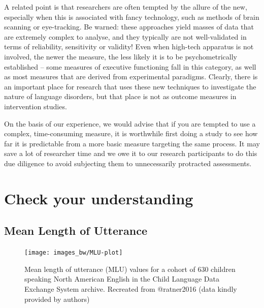 \documentclass{krantz}
\begin{document}
A related point is that researchers are often tempted by the allure of the new, especially when this is associated with fancy technology, such as methods of brain scanning or eye-tracking. Be warned: these approaches yield masses of data that are extremely complex to analyse, and they typically are not well-validated in terms of reliability, sensitivity or validity! Even when high-tech apparatus is not involved, the newer the measure, the less likely it is to be psychometrically established -- some measures of executive functioning fall in this category, as well as most measures that are derived from experimental paradigms. Clearly, there is an important place for research that uses these new techniques to investigate the nature of language disorders, but that place is not as outcome measures in intervention studies.

On the basis of our experience, we would advise that if you are tempted to use a complex, time-consuming measure, it is worthwhile first doing a study to see how far it is predictable from a more basic measure targeting the same process. It may save a lot of researcher time and we owe it to our research participants to do this due diligence to avoid subjecting them to unnecessarily protracted assessments.

\hypertarget{check-your-understanding-2}{%
\section{Check your understanding}\label{check-your-understanding-2}}

\hypertarget{mean-length-of-utterance}{%
\subsection{Mean Length of Utterance}\label{mean-length-of-utterance}}

\begin{figure}
\texttt{[image: images\_bw/MLU-plot]} \caption{Mean length of utterance (MLU) values for a cohort of 630 children speaking North American English in the Child Language Data Exchange System archive. Recreated from @ratner2016 (data kindly provided by authors)}\label{fig:MLU-plot}
\end{figure}
\end{document}
